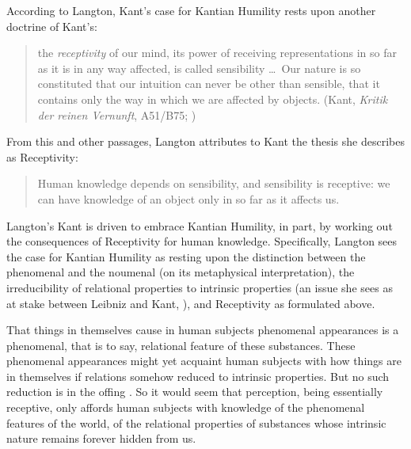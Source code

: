 According to Langton, Kant's case for Kantian Humility rests upon another doctrine of Kant's:
\begin{quote}
	the \emph{receptivity} of our mind, its power of receiving representations in so far as it is in any way affected, is called sensibility \ldots\ Our nature is so constituted that our intuition can never be other than sensible, that it contains only the way in which we are affected by objects. (Kant, \emph{Kritik der reinen Vernunft}, A51/B75; \citealt[93]{Smith:1965jw})
\end{quote}
From this and other passages, Langton attributes to Kant the thesis she describes as Receptivity:
\begin{quote}
	Human knowledge depends on sensibility, and sensibility is receptive: we can have knowledge of an object only in so far as it affects us. \citep[125]{Langton:1998aa}
\end{quote}
Langton's Kant is driven to embrace Kantian Humility, in part, by working out the consequences of Receptivity for human knowledge. Specifically, Langton sees the case for Kantian Humility as resting upon the distinction between the phenomenal and the noumenal (on its metaphysical interpretation), the irreducibility of relational properties to intrinsic properties (an issue she sees as at stake between Leibniz and Kant, \citealt[chapters 4 and 5]{Langton:1998aa}), and Receptivity as formulated above. 

That things in themselves cause in human subjects phenomenal appearances is a phenomenal, that is to say, relational feature of these substances. These phenomenal appearances might yet acquaint human subjects with how things are in themselves if relations somehow reduced to intrinsic properties. But no such reduction is in the offing \citep[chapter 5]{Langton:1998aa}. So it would seem that perception, being essentially receptive, only affords human subjects with knowledge of the phenomenal features of the world, of the relational properties of substances whose intrinsic nature remains forever hidden from us.

